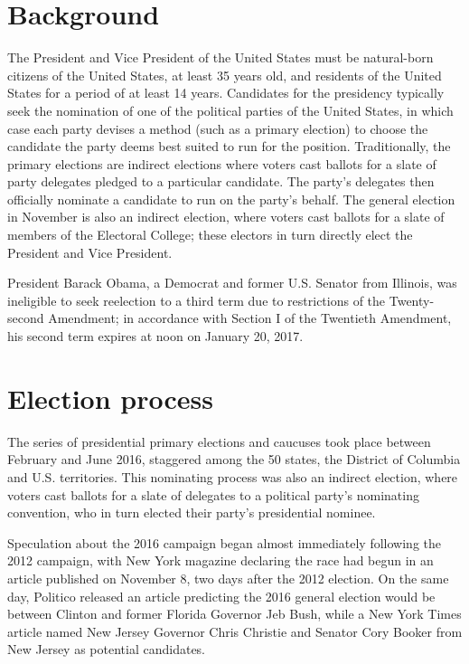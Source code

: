 \section{Background}
The President and Vice President of the United States must be natural-born citizens of the United States, at least 35 years old, and residents of the United States for a period of at least 14 years. Candidates for the presidency typically seek the nomination of one of the political parties of the United States, in which case each party devises a method (such as a primary election) to choose the candidate the party deems best suited to run for the position. Traditionally, the primary elections are indirect elections where voters cast ballots for a slate of party delegates pledged to a particular candidate. The party's delegates then officially nominate a candidate to run on the party's behalf. The general election in November is also an indirect election, where voters cast ballots for a slate of members of the Electoral College; these electors in turn directly elect the President and Vice President.

President Barack Obama, a Democrat and former U.S. Senator from Illinois, was ineligible to seek reelection to a third term due to restrictions of the Twenty-second Amendment; in accordance with Section I of the Twentieth Amendment, his second term expires at noon on January 20, 2017.

\newpage

\section{Election process}
The series of presidential primary elections and caucuses took place between February and June 2016, staggered among the 50 states, the District of Columbia and U.S. territories. This nominating process was also an indirect election, where voters cast ballots for a slate of delegates to a political party's nominating convention, who in turn elected their party's presidential nominee.

Speculation about the 2016 campaign began almost immediately following the 2012 campaign, with New York magazine declaring the race had begun in an article published on November 8, two days after the 2012 election. On the same day, Politico released an article predicting the 2016 general election would be between Clinton and former Florida Governor Jeb Bush, while a New York Times article named New Jersey Governor Chris Christie and Senator Cory Booker from New Jersey as potential candidates.

